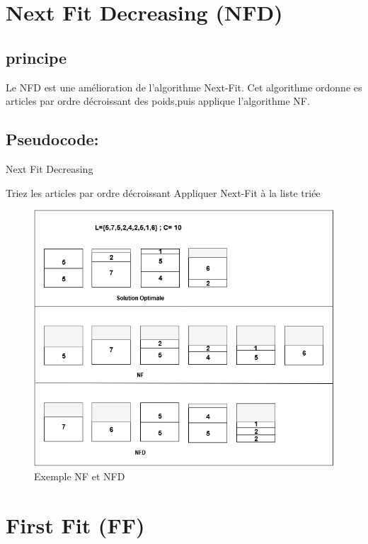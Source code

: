 \documentclass[12pt]{article}
\begin{document}
\section{Next Fit Decreasing (NFD)}
\subsection{principe}
Le NFD est une amélioration de l’algorithme Next-Fit. Cet algorithme ordonne es articles par
 ordre décroissant des poids,puis applique l’algorithme NF.

\subsection{Pseudocode:}
\begin{algorithm}[!h]
    \caption{Next Fit Decreasing }
    \begin{algorithmic}
        \STATE Triez les articles par ordre décroissant\;
        \STATE Appliquer Next-Fit à la liste triée\;
    \end{algorithmic}
\end{algorithm}

\begin{figure}[H]
    \includegraphics[width=\linewidth]{../figures/NF NFD better(1).png}
    \caption{Exemple NF et NFD}
\end{figure}
\section{First Fit (FF)}
\end{document}
